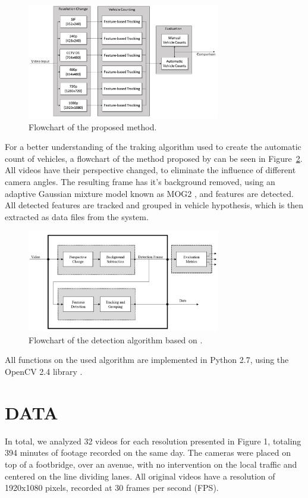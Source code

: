 \documentclass[article,12pt,a4paper,oneside,hidelinks]{memoir}
\begin{document}
\begin{figure}[h]
	\centering
	\includegraphics[width=0.75\textwidth]{Figuras/fig1.jpg}
	\caption{Flowchart of the proposed method.}
	\label{fig:fig1}
\end{figure}

For a better understanding of the traking algorithm used to create the automatic count of vehicles, a flowchart of the method proposed by \citet{marcomini2018} can be seen in Figure~\ref{fig:fig0}. All videos have their perspective changed, to eliminate the influence of different camera angles. The resulting frame has it's background removed, using an adaptive Gaussian mixture model known as MOG2 \citep{zivkovic2004improved}, and features are detected. All detected features are tracked and grouped in vehicle hypothesis, which is then extracted as data files from the system.

\begin{figure}[h]
	\centering
	\includegraphics[width=0.75\textwidth]{Figuras/fig0.jpg}
	\caption{Flowchart of the detection algorithm based on \citet{marcomini2018}.}
	\label{fig:fig0}
\end{figure}

All functions on the used algorithm are implemented in Python 2.7, using the OpenCV 2.4 library \citep{OpenCV2019}.

\section{DATA}
In total, we analyzed 32 videos for each resolution presented in Figure 1, totaling 394 minutes of footage recorded on the same day. The cameras were placed on top of a footbridge, over an avenue, with no intervention on the local traffic and centered on the line dividing lanes. All original videos have a resolution of 1920x1080 pixels, recorded at 30 frames per second (FPS).
\end{document}
